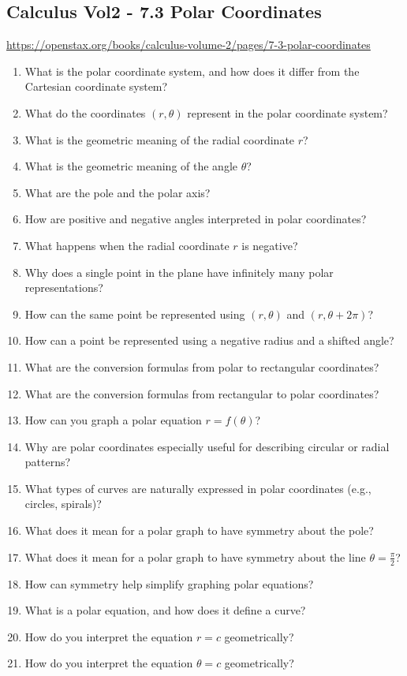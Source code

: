 \subsection{Calculus Vol2 - 7.3 Polar Coordinates}

\url{https://openstax.org/books/calculus-volume-2/pages/7-3-polar-coordinates}

\begin{enumerate}
  \item What is the polar coordinate system, and how does it differ from the Cartesian coordinate system?
  \item What do the coordinates $(r,\theta)$ represent in the polar coordinate system?
  \item What is the geometric meaning of the radial coordinate $r$?
  \item What is the geometric meaning of the angle $\theta$?
  \item What are the pole and the polar axis?
  \item How are positive and negative angles interpreted in polar coordinates?
  \item What happens when the radial coordinate $r$ is negative?
  \item Why does a single point in the plane have infinitely many polar representations?
  \item How can the same point be represented using $(r,\theta)$ and $(r,\theta + 2\pi)$?
  \item How can a point be represented using a negative radius and a shifted angle?
  \item What are the conversion formulas from polar to rectangular coordinates?
  \item What are the conversion formulas from rectangular to polar coordinates?
  \item How can you graph a polar equation $r = f(\theta)$?
  \item Why are polar coordinates especially useful for describing circular or radial patterns?
  \item What types of curves are naturally expressed in polar coordinates (e.g., circles, spirals)?
  \item What does it mean for a polar graph to have symmetry about the pole?
  \item What does it mean for a polar graph to have symmetry about the line $\theta = \frac{\pi}{2}$?
  \item How can symmetry help simplify graphing polar equations?
  \item What is a polar equation, and how does it define a curve?
  \item How do you interpret the equation $r = c$ geometrically?
  \item How do you interpret the equation $\theta = c$ geometrically?
\end{enumerate}

